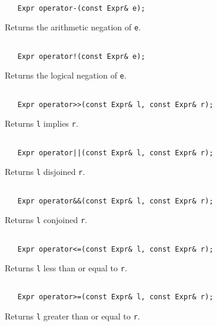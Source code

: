 \documentclass{article}
\begin{document}
\noindent
\hrulefill

\begin{verbatim}

   Expr operator-(const Expr& e);

\end{verbatim}
Returns the arithmetic negation of \texttt{e}.

\noindent
\hrulefill

\begin{verbatim}

   Expr operator!(const Expr& e);

\end{verbatim}
Returns the logical negation of \texttt{e}.

\noindent
\hrulefill

\begin{verbatim}

   Expr operator>>(const Expr& l, const Expr& r);

\end{verbatim}
Returns \texttt{l} implies \texttt{r}.

\noindent
\hrulefill

\begin{verbatim}

   Expr operator||(const Expr& l, const Expr& r);

\end{verbatim}
Returns \texttt{l} disjoined \texttt{r}.

\noindent
\hrulefill

\begin{verbatim}

   Expr operator&&(const Expr& l, const Expr& r);

\end{verbatim}
Returns \texttt{l} conjoined \texttt{r}.

\noindent
\hrulefill

\begin{verbatim}

   Expr operator<=(const Expr& l, const Expr& r);

\end{verbatim}
Returns \texttt{l} less than or equal to \texttt{r}.

\noindent
\hrulefill

\begin{verbatim}

   Expr operator>=(const Expr& l, const Expr& r);

\end{verbatim}
Returns \texttt{l} greater than or equal to \texttt{r}.
\end{document}
